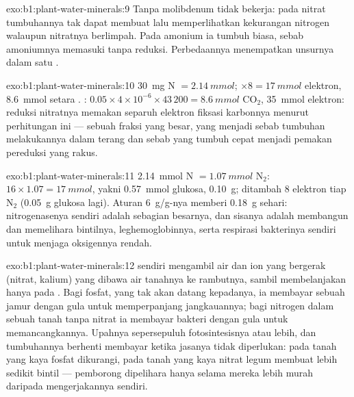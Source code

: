\begin{solution}{exo:b1:plant-water-minerals:9}
Tanpa molibdenum  tidak bekerja: pada nitrat
tumbuhannya tak dapat membuat  lalu memperlihatkan
kekurangan nitrogen walaupun nitratnya berlimpah. Pada amonium ia
tumbuh biasa, sebab amoniumnya memasuki  tanpa reduksi.
Perbedaannya menempatkan unsurnya dalam satu .
\end{solution}

\begin{solution}{exo:b1:plant-water-minerals:10}
\qty{30}{mg} N $= \qty{2.14}{mmol}$; $\times 8 = \qty{17}{mmol}$
elektron, \qty{8.6}{mmol} setara . : $0.05\times
4\times 10^{-6}\times 43\,200 = \qty{8.6}{mmol}$ $\mathrm{CO_2}$,
\qty{35}{mmol} elektron: reduksi nitratnya memakan separuh elektron
fiksasi karbonnya menurut perhitungan ini --- sebuah fraksi yang besar,
yang menjadi sebab tumbuhan melakukannya dalam terang dan sebab 
yang tumbuh cepat menjadi pemakan pereduksi yang rakus.
\end{solution}

\begin{solution}{exo:b1:plant-water-minerals:11}
\qty{2.14}{mmol} N $= \qty{1.07}{mmol}$ $\mathrm{N_2}$: 
$16\times 1.07 = \qty{17}{mmol}$, yakni \qty{0.57}{mmol} glukosa,
\qty{0.10}{g}; ditambah 8 elektron tiap $\mathrm{N_2}$ (\qty{0.05}{g}
glukosa lagi). Aturan \qty{6}{g/g}-nya memberi \qty{0.18}{g} sehari:
nitrogenasenya sendiri adalah sebagian besarnya, dan sisanya adalah
membangun dan memelihara bintilnya, leghemoglobinnya, serta respirasi
bakterinya sendiri untuk menjaga oksigennya rendah.
\end{solution}

\begin{solution}{exo:b1:plant-water-minerals:12}
 sendiri mengambil air dan ion yang bergerak (nitrat, kalium)
yang dibawa air tanahnya ke rambutnya, sambil membelanjakan  hanya
pada . Bagi fosfat, yang tak akan datang kepadanya, ia
membayar sebuah jamur dengan gula untuk memperpanjang jangkauannya;
bagi nitrogen dalam sebuah tanah tanpa nitrat ia membayar bakteri
dengan gula untuk memancangkannya. Upahnya sepersepuluh fotosintesisnya
atau lebih, dan tumbuhannya berhenti membayar ketika jasanya tidak
diperlukan: pada tanah yang kaya fosfat  dikurangi, pada
tanah yang kaya nitrat legum membuat lebih sedikit bintil --- pemborong
dipelihara hanya selama mereka lebih murah daripada mengerjakannya
sendiri.
\end{solution}

